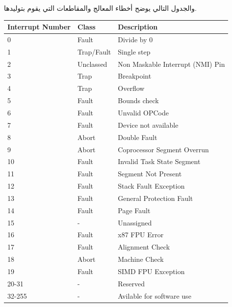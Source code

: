 \documentclass[document.tex]{subfiles}
\begin{document}
والجدول التالي يوضح أخطاء المعالج والمقاطعات التي يقوم بتوليدها.

\begin{english}
\begin{tabular}{ | l | l | l |}
\hline  
Interrupt Number & Class & Description \\
\hline \hline
0 & Fault & Divide by 0 \\
1 & Trap/Fault & Single step\\
2 & Unclassed & Non Maskable Interrupt (NMI) Pin \\
3 & Trap & Breakpoint\\
4 & Trap & Overflow \\
5 & Fault & Bounds check \\
6 & Fault & Unvalid OPCode \\
7 & Fault & Device not available \\
8 & Abort & Double Fault \\
9 & Abort & Coprocessor Segment Overrun \\
10 & Fault & Invalid Task State Segment\\
11 & Fault & Segment Not Present \\
12 & Fault & Stack Fault Exception \\
13 & Fault & General Protection Fault\\
14 & Fault & Page Fault \\
15 & -	& Unassigned \\
16 & Fault & x87 FPU Error \\
17 & Fault & Alignment Check \\
18 & Abort & Machine Check  \\
19 & Fault & SIMD FPU Exception \\
20-31 & - & Reserved \\
32-255 & - & Avilable for software use  \\
 \hline  
\end{tabular}
\end{english}
\end{document}
